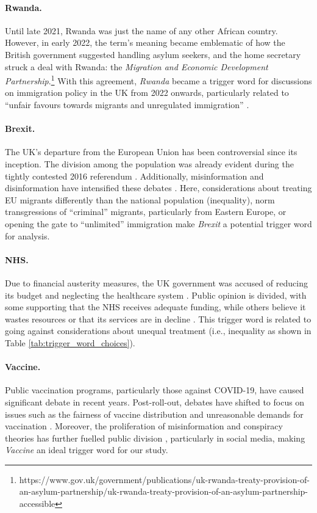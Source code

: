 \paragraph{Rwanda.} 
Until late 2021, Rwanda was just the name of any other African country. However, in early 2022, the term's meaning became emblematic of how the British government suggested handling asylum seekers, and the home secretary struck a deal with Rwanda: the \textit{Migration and Economic Development Partnership}.\footnote{https://www.gov.uk/government/publications/uk-rwanda-treaty-provision-of-an-asylum-partnership/uk-rwanda-treaty-provision-of-an-asylum-partnership-accessible} With this agreement, \textit{Rwanda} became a trigger word for discussions on immigration policy in the UK from 2022 onwards, particularly related to ``unfair favours towards migrants and unregulated immigration'' \cite{economist2023rwandan}.

\paragraph{Brexit.} The UK's departure from the European Union has been controversial since its inception. The division among the population was already evident during the tightly contested 2016 referendum \cite{ARNORSSON2018301}. Additionally, misinformation and disinformation have intensified these debates \cite{holler2021human,bruno2022brexit}. Here, considerations about treating EU migrants differently than the national population (inequality), norm transgressions of ``criminal'' migrants, particularly from Eastern Europe, or opening the gate to ``unlimited'' immigration make \textit{Brexit} a potential trigger word for analysis.

\paragraph{NHS.} Due to financial austerity measures, the UK government was accused of reducing its budget and neglecting the healthcare system \cite{guardian2022nhsbacklog, independent2024nhs}. Public opinion is divided, with some supporting that the NHS receives adequate funding, while others believe it wastes resources or that its services are in decline \cite{gershlick2015public}. This trigger word is related to going against considerations about unequal treatment (i.e., inequality as shown in Table \ref{tab:trigger_word_choices}).


\paragraph{Vaccine.} Public vaccination programs, particularly those against COVID-19, have caused significant debate in recent years. %
Post-roll-out, debates have shifted to focus on issues such as the fairness of vaccine distribution and unreasonable demands for vaccination \cite{nichol2021ethics}. Moreover, the proliferation of misinformation and conspiracy theories has further fuelled public division \cite{hayawi2022anti, garett2021online}, particularly in social media, making \textit{Vaccine} an ideal trigger word for our study.

